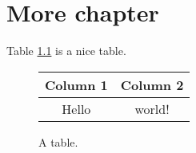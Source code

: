 \chapter{More chapter}
Table \ref{table:mytable} is a nice table.

\begin{figure}[h]
  \centering
  \begin{tabular}{cc}
    \toprule
    Column 1 & Column 2 \\
    \midrule
    Hello & world! \\
    \bottomrule
  \end{tabular}
  \caption{A table.}
  \label{table:mytable}
\end{figure}
